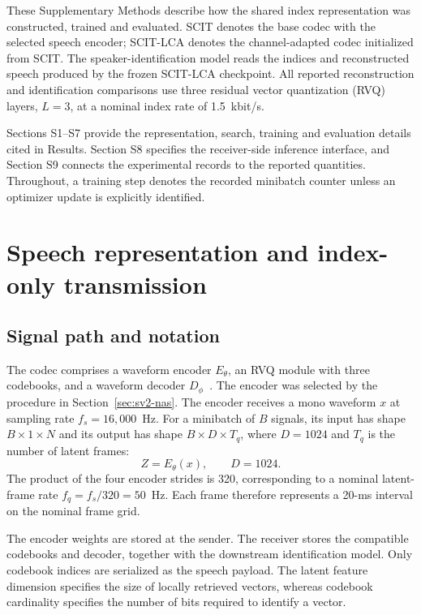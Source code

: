 These Supplementary Methods describe how the shared index representation was constructed, trained and evaluated. SCIT denotes the base codec with the selected speech encoder; SCIT-LCA denotes the channel-adapted codec initialized from SCIT. The speaker-identification model reads the indices and reconstructed speech produced by the frozen SCIT-LCA checkpoint. All reported reconstruction and identification comparisons use three residual vector quantization (RVQ) layers, $L=3$, at a nominal index rate of 1.5~kbit/s.

Sections S1--S7 provide the representation, search, training and evaluation details cited in Results. Section S8 specifies the receiver-side inference interface, and Section S9 connects the experimental records to the reported quantities. Throughout, a training step denotes the recorded minibatch counter unless an optimizer update is explicitly identified.

\section{Speech representation and index-only transmission}
\label{sec:sv2-representation}

\subsection{Signal path and notation}
The codec comprises a waveform encoder $E_\theta$, an RVQ module with three codebooks, and a waveform decoder $D_\phi$~\cite{speechtokenizer}. The encoder was selected by the procedure in Section~\ref{sec:sv2-nas}. The encoder receives a mono waveform $x$ at sampling rate $f_s=16{,}000$~Hz. For a minibatch of $B$ signals, its input has shape $B\times1\times N$ and its output has shape $B\times D\times T_q$, where $D=1024$ and $T_q$ is the number of latent frames:
\begin{equation}
 Z=E_\theta(x),\qquad D=1024.
 \label{eq:sv2-encoder}
\end{equation}
The product of the four encoder strides is 320, corresponding to a nominal latent-frame rate $f_q=f_s/320=50$~Hz. Each frame therefore represents a 20-ms interval on the nominal frame grid.

The encoder weights are stored at the sender. The receiver stores the compatible codebooks and decoder, together with the downstream identification model. Only codebook indices are serialized as the speech payload. The latent feature dimension specifies the size of locally retrieved vectors, whereas codebook cardinality specifies the number of bits required to identify a vector.

